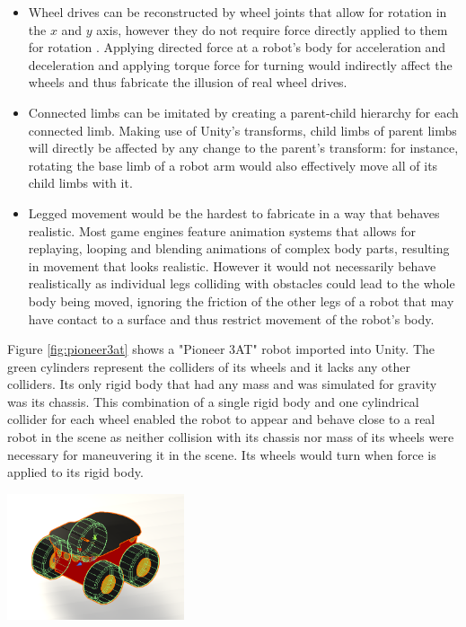 \begin{itemize}
    \item Wheel drives can be reconstructed by wheel joints that allow for rotation in the $x$ and $y$ axis, however they do not require force directly applied to them for rotation . Applying directed force at a robot's body for acceleration and deceleration and applying torque force for turning would indirectly affect the wheels and thus fabricate the illusion of real wheel drives. 
    \item Connected limbs can be imitated by creating a parent-child hierarchy for each connected limb. Making use of Unity's transforms, child limbs of parent limbs will directly be affected by any change to the parent's transform: for instance, rotating the base limb of a robot arm would also effectively move all of its child limbs with it.
    \item Legged movement would be the hardest to fabricate in a way that behaves realistic. Most game engines feature animation systems that allows for replaying, looping and blending animations of complex body parts, resulting in movement that looks realistic. However it would not necessarily behave realistically as individual legs colliding with obstacles could lead to the whole body being moved, ignoring the friction of the other legs of a robot that may have contact to a surface and thus restrict movement of the robot's body.
\end{itemize}

Figure \ref{fig:pioneer3at} shows a "Pioneer 3AT" robot imported into Unity. The green cylinders represent the colliders of its wheels and it lacks any other colliders. Its only rigid body that had any mass and was simulated for gravity was its chassis. This combination of a single rigid body and one cylindrical collider for each wheel enabled the robot to appear and behave close to a real robot in the scene as neither collision with its chassis nor mass of its wheels were necessary for maneuvering it in the scene. Its wheels would turn when force is applied to its rigid body.

\begin{center}
    \includegraphics[width=0.39\textwidth]{img/ch05/Pioneer3AT.png}
    \label{fig:pioneer3at}
\end{center}

